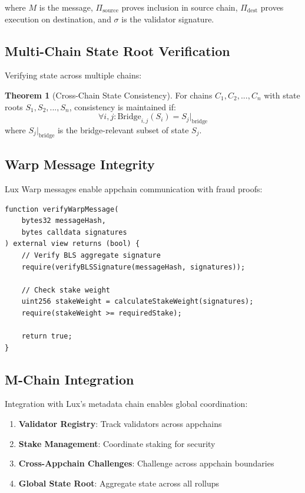 \documentclass[11pt,a4paper]{article}
\theoremstyle{definition}
\newtheorem{theorem}{Theorem}[section]
\begin{document}
where $M$ is the message, $\Pi_{\text{source}}$ proves inclusion in source chain, $\Pi_{\text{dest}}$ proves execution on destination, and $\sigma$ is the validator signature.

\subsection{Multi-Chain State Root Verification}

Verifying state across multiple chains:

\begin{theorem}[Cross-Chain State Consistency]
For chains $C_1, C_2, ..., C_n$ with state roots $S_1, S_2, ..., S_n$, consistency is maintained if:
\begin{equation}
\forall i,j : \text{Bridge}_{i,j}(S_i) = S_j|_{\text{bridge}}
\end{equation}
where $S_j|_{\text{bridge}}$ is the bridge-relevant subset of state $S_j$.
\end{theorem}

\subsection{Warp Message Integrity}

Lux Warp messages enable appchain communication with fraud proofs:

\begin{lstlisting}[language=Solidity, caption=Warp Message Verification]
function verifyWarpMessage(
    bytes32 messageHash,
    bytes calldata signatures
) external view returns (bool) {
    // Verify BLS aggregate signature
    require(verifyBLSSignature(messageHash, signatures));
    
    // Check stake weight
    uint256 stakeWeight = calculateStakeWeight(signatures);
    require(stakeWeight >= requiredStake);
    
    return true;
}
\end{lstlisting}

\subsection{M-Chain Integration}

Integration with Lux's metadata chain enables global coordination:

\begin{enumerate}
    \item \textbf{Validator Registry}: Track validators across appchains
    \item \textbf{Stake Management}: Coordinate staking for security
    \item \textbf{Cross-Appchain Challenges}: Challenge across appchain boundaries
    \item \textbf{Global State Root}: Aggregate state across all rollups
\end{enumerate}
\end{document}
